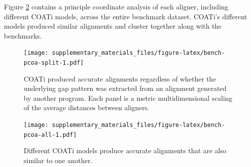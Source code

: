 \documentclass[
]{article}
\begin{document}
Figure \ref{fig:bench-pcoa-all} contains a principle coordinate analysis of each aligner, including different COATi models, across the entire benchmark dataset. COATi's different models produced similar alignments and cluster together along with the benchmarks.

\begin{figure}
\centering
\texttt{[image: supplementary\_materials\_files/figure-latex/bench-pcoa-split-1.pdf]}
\caption{\label{fig:bench-pcoa-split}COATi produced accurate alignments regardless of whether the underlying gap pattern was extracted from an alignment generated by another program. Each panel is a metric multidimensional scaling of the average distances between aligners.}
\end{figure}

\begin{figure}
\centering
\texttt{[image: supplementary\_materials\_files/figure-latex/bench-pcoa-all-1.pdf]}
\caption{\label{fig:bench-pcoa-all}Different COATi models produce accurate alignments that are also similar to one another.}
\end{figure}
\end{document}
